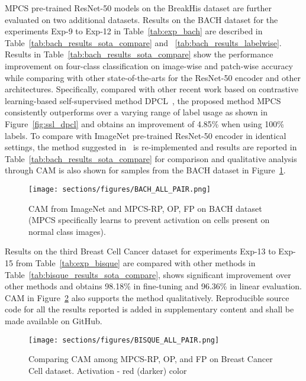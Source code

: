 \documentclass[conference]{IEEEtran}
\begin{document}
MPCS pre-trained ResNet-50 models on the BreakHis dataset are further evaluated on two additional datasets. Results on the BACH dataset for the experiments Exp-9 to Exp-12 in Table~\ref{tab:exp_bach} are described in Table~\ref{tab:bach_results_sota_compare} and ~\ref{tab:bach_results_labelwise}. Results in Table~\ref{tab:bach_results_sota_compare} show the performance improvement on four-class classification on image-wise and patch-wise accuracy while comparing with other state-of-the-arts for the ResNet-50 encoder and other architectures. Specifically, compared with other recent work based on contrastive learning-based self-supervised method DPCL~\cite{ciga2022self}, the proposed method MPCS consistently outperforms over a varying range of label usage as shown in Figure~\ref{fig:ssl_dpcl} and obtains an improvement of 4.85\% when using 100\% labels. To compare with ImageNet pre-trained ResNet-50 encoder in identical settings, the method suggested in~\cite{vesal2018classification} is re-implemented and results are reported in Table~\ref{tab:bach_results_sota_compare} for comparison and qualitative analysis through CAM is also shown for samples from the BACH dataset in Figure~\ref{fig:cam_bach}.
\begin{figure}[!ht]
    \centering
    \texttt{[image: sections/figures/BACH\_ALL\_PAIR.png]}
    \caption{CAM from ImageNet and MPCS-RP, OP, FP on BACH dataset (MPCS specifically learns to prevent activation on cells present on normal class images).}
    \label{fig:cam_bach}
    \vspace{-6mm}
\end{figure}
Results on the third Breast Cell Cancer dataset for experiments Exp-13 to Exp-15 from Table~\ref{tab:exp_bisque} are compared with other methods in Table~\ref{tab:bisque_results_sota_compare}, shows significant improvement over other methods and obtains 98.18\% in fine-tuning and 96.36\% in linear evaluation. CAM in Figure~\ref{fig:cam_bisque} also supports the method qualitatively. Reproducible source code for all the results reported is added in supplementary content and shall be made available on GitHub. 
\begin{figure}[!ht]
    \centering
    \texttt{[image: sections/figures/BISQUE\_ALL\_PAIR.png]}
    \caption{Comparing CAM among MPCS-RP, OP, and FP on Breast Cancer Cell dataset. Activation - red (darker) color}
    \label{fig:cam_bisque}
    \vspace{-6mm}
\end{figure}
\end{document}
